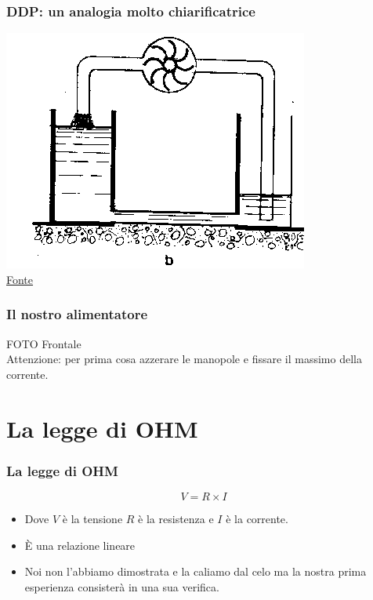 		\begin{frame}[c]\frametitle{DDP: un analogia molto chiarificatrice}
		    
			\includegraphics[width=8CM]{./img/ddp2.png}\\

			\href{http://web.mclink.it/MK1411/Apprendistato/ImpiantiElettrici/Lezioni\%20di\%20Elettrotecnica/Lezione\%201_30_Web.htm}{Fonte}
		
		\end{frame}

		\begin{frame}[c]\frametitle{Il nostro alimentatore}
		    
			FOTO Frontale\\
			\color{red}Attenzione:
			\color{black}per prima cosa azzerare le manopole e fissare il massimo della corrente.
		
		\end{frame}


	\section{La legge di OHM} %
	\label{sec:la_legge_di_ohm}
		\begin{frame}[c]\frametitle{La legge di OHM}
		    	
			\[
				V = R \times I
			\]

			\begin{itemize}
				\item Dove $V$ è la tensione $R$ è la resistenza e $I$ è la corrente.
				\pause
			 	\item \`E una relazione lineare
			 	\item Noi non l'abbiamo dimostrata e la caliamo dal celo ma la nostra prima esperienza consisterà in una sua verifica.
			 \end{itemize} 

		\end{frame}

